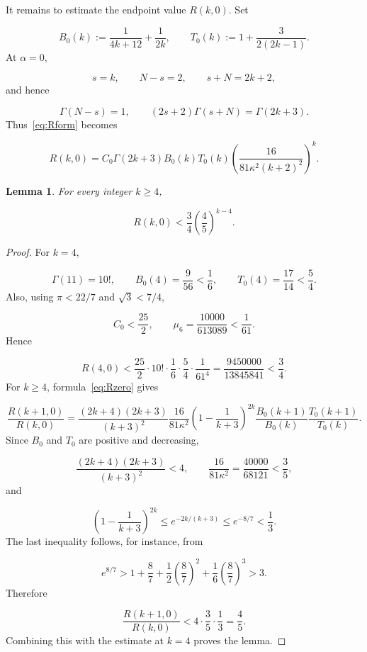 \documentclass[11pt]{article}
\theoremstyle{plain}
\newtheorem{lemma}[theorem]{Lemma}
\theoremstyle{definition}
\theoremstyle{remark}
\begin{document}
It remains to estimate the endpoint value $R(k,0)$. Set

\[
  B_{0}(k) := \frac{1}{4k+12} + \frac{1}{2k} , \qquad  T_{0}(k) := 1 + \frac{3}{2(2k-1)} .
\]
At $\alpha = 0$,

\[
  s = k , \qquad  N-s = 2 , \qquad  s+N = 2k+2 ,
\]
and hence

\[
  \Gamma (N-s) = 1 , \qquad  (2s+2)\Gamma (s+N) = \Gamma (2k+3) .
\]
Thus~\eqref{eq:Rform} becomes

\begin{equation}\label{eq:Rzero}
  R(k,0) = C_{0}\Gamma (2k+3) B_{0}(k) T_{0}(k) \left( \frac{16}{81\kappa^{2}(k+2)^{2}} \right)^{k} .
\end{equation}

\begin{lemma}\label{res:6.2}
For every integer $k \ge 4$,

\[
  R(k,0) < \frac{3}{4}\left( \frac{4}{5} \right)^{k-4} .
\]
\end{lemma}

\begin{proof}
For $k = 4$,

\[
  \Gamma (11) = 10! , \qquad  B_{0}(4) = \frac{9}{56} < \frac{1}{6} , \qquad  T_{0}(4) = \frac{17}{14} < \frac{5}{4} .
\]
Also, using $\pi < 22/7$ and $\sqrt{3} < 7/4$,

\[
  C_{0} < \frac{25}{2} , \qquad  \mu_{6} = \frac{10000}{613089} < \frac{1}{61} .
\]
Hence

\[
  R(4,0) < \frac{25}{2} \cdot 10! \cdot \frac{1}{6} \cdot \frac{5}{4} \cdot \frac{1}{61^{4}} = \frac{9450000}{13845841} < \frac{3}{4} .
\]
For $k \ge 4$, formula~\eqref{eq:Rzero} gives

\[
  \frac{R(k+1,0)}{R(k,0)} = \frac{(2k+4)(2k+3)}{(k+3)^{2}} \frac{16}{81\kappa^{2}} \left( 1 - \frac{1}{k+3} \right)^{2k} \frac{B_{0}(k+1)}{B_{0}(k)} \frac{T_{0}(k+1)}{T_{0}(k)} .
\]
Since $B_{0}$ and $T_{0}$ are positive and decreasing,

\[
  \frac{(2k+4)(2k+3)}{(k+3)^{2}} < 4 , \qquad  \frac{16}{81\kappa^{2}} = \frac{40000}{68121} < \frac{3}{5} ,
\]
and

\[
  \left( 1 - \frac{1}{k+3} \right)^{2k} \le e^{-2k/(k+3)} \le e^{-8/7} < \frac{1}{3} .
\]
The last inequality follows, for instance, from

\[
  e^{8/7} > 1 + \frac{8}{7} + \frac{1}{2}\left( \frac{8}{7} \right)^{2} + \frac{1}{6}\left( \frac{8}{7} \right)^{3} > 3 .
\]
Therefore

\[
  \frac{R(k+1,0)}{R(k,0)} < 4 \cdot \frac{3}{5} \cdot \frac{1}{3} = \frac{4}{5} .
\]
Combining this with the estimate at $k = 4$ proves the lemma.
\end{proof}
\end{document}
